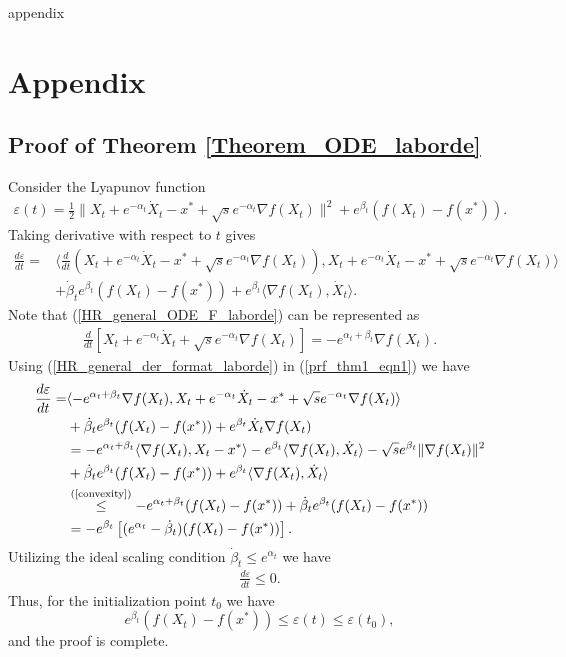 \documentclass{article}
\theoremstyle{plain}
\theoremstyle{definition}
\theoremstyle{remark}
\begin{document}







appendix
\section{Appendix}
\subsection{Proof of Theorem \ref{Theorem_ODE_laborde}}\label{thm1_proof}
Consider the Lyapunov function 
\begin{align}\label{lyap_theorem_C}
    \varepsilon(t)=\frac{1}{2}\|X_t+e^{-\alpha_t}\dot X_t-x^*+\sqrt{s}e^{-\alpha_t}\nabla f(X_t)\|^2+e^{\beta_t}(f(X_t)-f(x^*)).
\end{align}
Taking derivative with respect to $t$ gives
\begin{align}\label{prf_thm1_eqn1}
    \frac{d \varepsilon}{dt}=&\langle \frac{d}{dt}(X_t+e^{-\alpha_t}\dot X_t-x^*+\sqrt{s}e^{-\alpha_t}\nabla f(X_t)),X_t+e^{-\alpha_t}\dot X_t-x^*+\sqrt{s}e^{-\alpha_t}\nabla f(X_t)\rangle\nonumber\\
    & +\dot \beta_t e^{\beta_t}(f(X_t)-f(x^*))+e^{\beta_t}\langle \nabla f(X_t), \dot X_t\rangle.
\end{align}
Note that (\ref{HR_general_ODE_F_laborde}) can be represented as
\begin{align}\label{HR_general_der_format_laborde}
    \frac{d}{dt}\left[X_t+e^{-\alpha_t}\dot X_t+\sqrt{s}e^{-\alpha_t}\nabla f(X_t)\right]=-e^{\alpha_t+\beta_t}\nabla f(X_t).
\end{align}
Using (\ref{HR_general_der_format_laborde}) in (\ref{prf_thm1_eqn1}) we have
\begin{align}
     \frac{d \varepsilon}{dt}=& \langle -e^{\alpha_t+\beta_t}\nabla f(X_t),X_t+e^{-\alpha_t}\dot X_t-x^*+\sqrt{s}e^{-\alpha_t}\nabla f(X_t) \rangle \nonumber \\
     &+\dot \beta_t e^{\beta_t}(f(X_t)-f(x^*))+e^{\beta_t}\dot X_t\nabla f(X_t)\nonumber\\
     &= -e^{\alpha_t+\beta_t}\langle\nabla f(X_t),X_t-x^*\rangle -e^{\beta_t}\langle \nabla f(X_t),\dot X_t\rangle -\sqrt{s}e^{\beta_t}\|\nabla f(X_t)\|^2\nonumber\\
     &+\dot \beta_te^{\beta_t}(f(X_t)-f(x^*))+e^{\beta_t}\langle \nabla f(X_t),\dot X_t \rangle\nonumber\\
     & \overset{\text{(\ref{convexity}})}{\leq} -e^{\alpha_t+\beta_t}(f(X_t)-f(x^*))+\dot \beta_te^{\beta_t}(f(X_t)-f(x^*))\nonumber\\
     & = -e^{\beta_t}\left[(e^{\alpha_t}-\dot \beta_t)(f(X_t)-f(x^*))\right].\nonumber
\end{align}
Utilizing the ideal scaling condition $\dot \beta_t\leq e^{\alpha_t}$ we have
\begin{align}
     \frac{d \varepsilon}{dt}\leq 0.\nonumber
\end{align}
Thus, for the initialization point $t_0$ we have
$$e^{\beta_t}(f(X_t)-f(x^*))\leq \varepsilon(t)\leq \varepsilon(t_0),$$
and the proof is complete.
\end{document}
